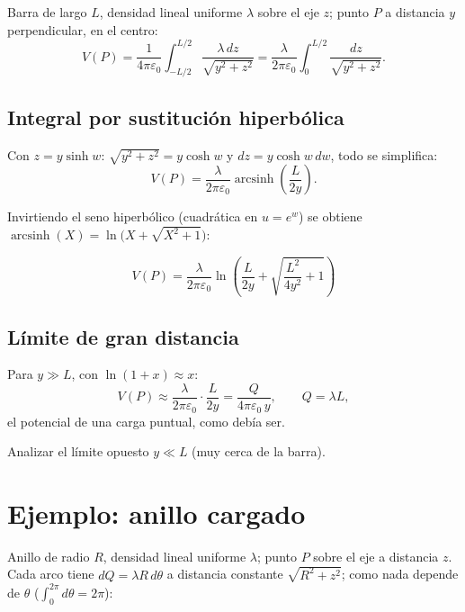 \documentclass[12pt,a4paper]{article}
\begin{document}
Barra de largo $L$, densidad lineal uniforme $\lambda$ sobre el eje $z$;
punto $P$ a distancia $y$ perpendicular, en el centro:
\[
V(P) = \frac{1}{4\pi\varepsilon_0}\int_{-L/2}^{L/2}\frac{\lambda\, dz}{\sqrt{y^2+z^2}}
     = \frac{\lambda}{2\pi\varepsilon_0}\int_{0}^{L/2}\frac{dz}{\sqrt{y^2+z^2}}.
\]

\subsection{Integral por sustitución hiperbólica}

Con $z = y\sinh w$: $\sqrt{y^2+z^2} = y\cosh w$ y $dz = y\cosh w\, dw$,
todo se simplifica:
\[
V(P) = \frac{\lambda}{2\pi\varepsilon_0}\operatorname{arcsinh}\!\left(\frac{L}{2y}\right).
\]

Invirtiendo el seno hiperbólico (cuadrática en $u=e^{w}$) se obtiene
$\operatorname{arcsinh}(X) = \ln\!\big(X + \sqrt{X^2+1}\big)$:

\begin{keybox}
  \[
  \boxed{V(P) = \frac{\lambda}{2\pi\varepsilon_0}
         \ln\!\left(\frac{L}{2y} + \sqrt{\frac{L^2}{4y^2}+1}\right)}
  \]
\end{keybox}

\subsection{Límite de gran distancia}

Para $y \gg L$, con $\ln(1+x)\approx x$:
\[
V(P) \approx \frac{\lambda}{2\pi\varepsilon_0}\cdot\frac{L}{2y}
     = \frac{Q}{4\pi\varepsilon_0\, y}, \qquad Q = \lambda L,
\]
el potencial de una carga puntual, como debía ser.

\begin{notebox}[Ejercicio]
  Analizar el límite opuesto $y \ll L$ (muy cerca de la barra).
\end{notebox}

\section{Ejemplo: anillo cargado}

Anillo de radio $R$, densidad lineal uniforme $\lambda$; punto $P$ sobre
el eje a distancia $z$. Cada arco tiene $dQ = \lambda R\, d\theta$ a
distancia constante $\sqrt{R^2+z^2}$; como nada depende de $\theta$
($\int_0^{2\pi}d\theta = 2\pi$):
\end{document}
